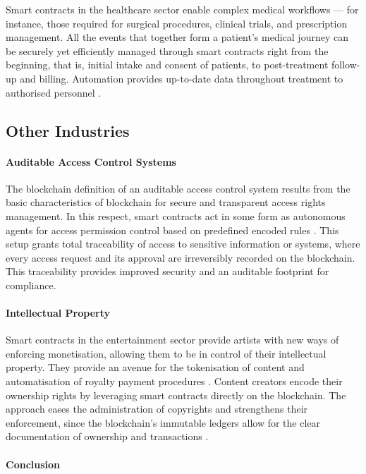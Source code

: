 Smart contracts in the healthcare sector enable complex medical workflows — for instance, those required for surgical procedures, clinical trials, and prescription management. All the events that together form a patient's medical journey can be securely yet efficiently managed through smart contracts right from the beginning, that is, initial intake and consent of patients, to post-treatment follow-up and billing. Automation provides up-to-date data throughout treatment to authorised personnel \cite{Khatoon2020}.

\subsection{Other Industries}

\paragraph{Auditable Access Control Systems}

The blockchain definition of an auditable access control system results from the basic characteristics of blockchain for secure and transparent access rights management. In this respect, smart contracts act in some form as autonomous agents for access permission control based on predefined encoded rules \cite{DamianoEtAl2019}. This setup grants total traceability of access to sensitive information or systems, where every access request and its approval are irreversibly recorded on the blockchain. This traceability provides improved security and an auditable footprint for compliance. 

\paragraph{Intellectual Property}

Smart contracts in the entertainment sector provide artists with new ways of enforcing monetisation, allowing them to be in control of their intellectual property. They provide an avenue for the tokenisation of content and automatisation of royalty payment procedures \cite{Hauck2021}. Content creators encode their ownership rights by leveraging smart contracts directly on the blockchain. The approach eases the administration of copyrights and strengthens their enforcement, since the blockchain's immutable ledgers allow for the clear documentation of ownership and transactions \cite{Hauck2021}.

\paragraph{Conclusion}


